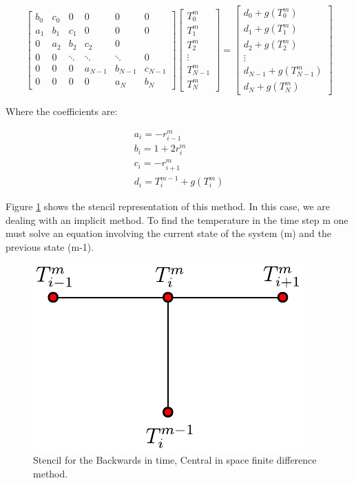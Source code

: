 $$
\begin{bmatrix}
         b_0 & c_0 & 0 & 0 & 0 & 0 \\
         a_1 & b_1 & c_1 & 0 & 0 & 0 \\ 
         0 & a_2 & b_2 & c_2 & 0 \\ 
         0 & 0 & \ddots & \ddots & \ddots & 0 \\
         0 & 0 & 0 & a_{N-1} & b_{N-1} & c_{N-1} \\
         0 & 0 & 0 & 0 & a_N & b_N 
     \end{bmatrix}
\begin{bmatrix}
         T^m_0  \\
         T^m_1 \\ 
         T^m_2  \\ 
         \vdots \\
         T^m_{N-1} \\
         T^m_N 
     \end{bmatrix}
     =
     \begin{bmatrix}
         d_0 + g(T^m_0) \\
         d_1 + g(T^m_1)\\ 
         d_2 + g(T^m_2)\\ 
         \vdots\\ 
         d_{N-1} + g(T^m_{N-1})\\
         d_{N} + g(T^m_{N}) 
     \end{bmatrix}
$$

Where the coefficients are:

\begin{equation}
    \begin{gathered}
        a_i = -r^m_{i-1} \\
    b_i = 1 + 2r^m_{i}\\
    c_i = - r^m_{i+1} \\
    d_i = T^{m-1}_i + g(T_i^m)
    \end{gathered}
\end{equation}

Figure \ref{fig:StensilBTCS} shows the stencil representation of this method. In this case, we are dealing with an implicit method. To find the temperature in the time step m one must solve an equation involving the current state of the system (m) and the previous state (m-1). 

\begin{figure}[h]
    \centering
    \includegraphics[width=0.35\columnwidth]{Stencils_FiniteDifferences/BTCS.pdf}
    \caption{Stencil for the Backwards in time, Central in space finite difference method.}
    \label{fig:StensilBTCS}
\end{figure}

